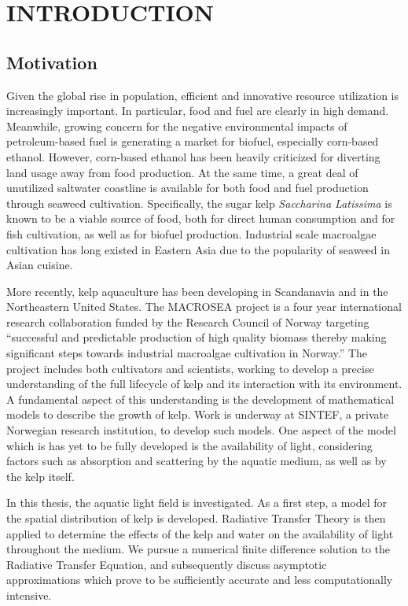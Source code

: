 \chapter{INTRODUCTION} \label{ch:intro}

\section{Motivation}
  Given the global rise in population, efficient and innovative resource utilization is increasingly important.
In particular, food and fuel are clearly in high demand.
Meanwhile, growing concern for the negative environmental impacts of petroleum-based fuel is generating a market for biofuel, especially corn-based ethanol.
However, corn-based ethanol has been heavily criticized for diverting land usage away from food production.
At the same time, a great deal of unutilized saltwater coastline is available for both food and fuel production through seaweed cultivation.
Specifically, the sugar kelp \textit{Saccharina Latissima} is known to be a viable source of food, both for direct human consumption and for fish cultivation, as well as for biofuel production.
Industrial scale macroalgae cultivation has long existed in Eastern Asia due to the popularity of seaweed in Asian cuisine.

  More recently, kelp aquaculture has been developing in Scandanavia and in the Northeastern United States.
The MACROSEA project is a four year international research collaboration funded by the Research Council of Norway targeting ``successful and predictable production of high quality biomass thereby making significant steps towards industrial macroalgae cultivation in Norway.''
The project includes both cultivators and scientists, working to develop a precise understanding of the full lifecycle of kelp and its interaction with its environment.
A fundamental aspect of this understanding is the development of mathematical models to describe the growth of kelp.
Work is underway at SINTEF, a private Norwegian research institution, to develop such models.
One aspect of the model which is has yet to be fully developed is the availability of light, considering factors such as absorption and scattering by the aquatic medium, as well as by the kelp itself.

  In this thesis, the aquatic light field is investigated.
As a first step, a model for the spatial distribution of kelp is developed.
Radiative Transfer Theory is then applied to determine the effects of the kelp and water on the availability of light throughout the medium.
We pursue a numerical finite difference solution to the Radiative Transfer Equation, and subsequently discuss asymptotic approximations which prove to be sufficiently accurate and less computationally intensive.

